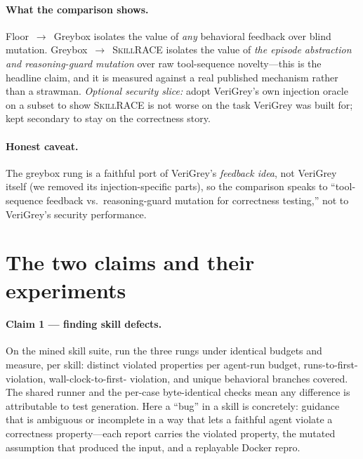\documentclass[11pt]{article}
\newcommand{\tool}{\textsc{SkillRACE}\xspace}
\begin{document}
\paragraph{What the comparison shows.} Floor~$\to$~Greybox isolates the value of
\emph{any} behavioral feedback over blind mutation. Greybox~$\to$~\tool isolates
the value of \emph{the episode abstraction and reasoning-guard mutation} over raw
tool-sequence novelty---this is the headline claim, and it is measured against a
real published mechanism rather than a strawman. \emph{Optional security slice:}
adopt VeriGrey's own injection oracle on a subset to show \tool is not worse on
the task VeriGrey was built for; kept secondary to stay on the correctness story.

\paragraph{Honest caveat.} The greybox rung is a faithful port of VeriGrey's
\emph{feedback idea}, not VeriGrey itself (we removed its injection-specific
parts), so the comparison speaks to ``tool-sequence feedback vs.\ reasoning-guard
mutation for correctness testing,'' not to VeriGrey's security performance.

\section{The two claims and their experiments}
\label{sec:evalplan}

\paragraph{Claim 1 --- finding skill defects.} On the mined skill suite, run the
three rungs under identical budgets and measure, per skill: distinct violated
properties per agent-run budget, runs-to-first-violation, wall-clock-to-first-%
violation, and unique behavioral branches covered. The shared runner and the
per-case byte-identical checks mean any difference is attributable to test
generation. Here a ``bug'' in a skill is concretely: guidance that is ambiguous
or incomplete in a way that lets a faithful agent violate a correctness
property---each report carries the violated property, the mutated assumption
that produced the input, and a replayable Docker repro.
\end{document}
